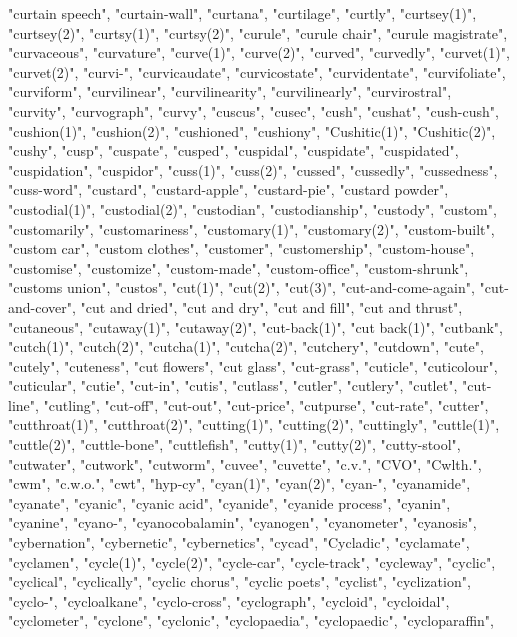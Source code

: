 "curtain speech",
"curtain-wall",
"curtana",
"curtilage",
"curtly",
"curtsey(1)",
"curtsey(2)",
"curtsy(1)",
"curtsy(2)",
"curule",
"curule chair",
"curule magistrate",
"curvaceous",
"curvature",
"curve(1)",
"curve(2)",
"curved",
"curvedly",
"curvet(1)",
"curvet(2)",
"curvi-",
"curvicaudate",
"curvicostate",
"curvidentate",
"curvifoliate",
"curviform",
"curvilinear",
"curvilinearity",
"curvilinearly",
"curvirostral",
"curvity",
"curvograph",
"curvy",
"cuscus",
"cusec",
"cush",
"cushat",
"cush-cush",
"cushion(1)",
"cushion(2)",
"cushioned",
"cushiony",
"Cushitic(1)",
"Cushitic(2)",
"cushy",
"cusp",
"cuspate",
"cusped",
"cuspidal",
"cuspidate",
"cuspidated",
"cuspidation",
"cuspidor",
"cuss(1)",
"cuss(2)",
"cussed",
"cussedly",
"cussedness",
"cuss-word",
"custard",
"custard-apple",
"custard-pie",
"custard powder",
"custodial(1)",
"custodial(2)",
"custodian",
"custodianship",
"custody",
"custom",
"customarily",
"customariness",
"customary(1)",
"customary(2)",
"custom-built",
"custom car",
"custom clothes",
"customer",
"customership",
"custom-house",
"customise",
"customize",
"custom-made",
"custom-office",
"custom-shrunk",
"customs union",
"custos",
"cut(1)",
"cut(2)",
"cut(3)",
"cut-and-come-again",
"cut-and-cover",
"cut and dried",
"cut and dry",
"cut and fill",
"cut and thrust",
"cutaneous",
"cutaway(1)",
"cutaway(2)",
"cut-back(1)",
"cut back(1)",
"cutbank",
"cutch(1)",
"cutch(2)",
"cutcha(1)",
"cutcha(2)",
"cutchery",
"cutdown",
"cute",
"cutely",
"cuteness",
"cut flowers",
"cut glass",
"cut-grass",
"cuticle",
"cuticolour",
"cuticular",
"cutie",
"cut-in",
"cutis",
"cutlass",
"cutler",
"cutlery",
"cutlet",
"cut-line",
"cutling",
"cut-off",
"cut-out",
"cut-price",
"cutpurse",
"cut-rate",
"cutter",
"cutthroat(1)",
"cutthroat(2)",
"cutting(1)",
"cutting(2)",
"cuttingly",
"cuttle(1)",
"cuttle(2)",
"cuttle-bone",
"cuttlefish",
"cutty(1)",
"cutty(2)",
"cutty-stool",
"cutwater",
"cutwork",
"cutworm",
"cuvee",
"cuvette",
"c.v.",
"CVO",
"Cwlth.",
"cwm",
"c.w.o.",
"cwt",
"hyp-cy",
"cyan(1)",
"cyan(2)",
"cyan-",
"cyanamide",
"cyanate",
"cyanic",
"cyanic acid",
"cyanide",
"cyanide process",
"cyanin",
"cyanine",
"cyano-",
"cyanocobalamin",
"cyanogen",
"cyanometer",
"cyanosis",
"cybernation",
"cybernetic",
"cybernetics",
"cycad",
"Cycladic",
"cyclamate",
"cyclamen",
"cycle(1)",
"cycle(2)",
"cycle-car",
"cycle-track",
"cycleway",
"cyclic",
"cyclical",
"cyclically",
"cyclic chorus",
"cyclic poets",
"cyclist",
"cyclization",
"cyclo-",
"cycloalkane",
"cyclo-cross",
"cyclograph",
"cycloid",
"cycloidal",
"cyclometer",
"cyclone",
"cyclonic",
"cyclopaedia",
"cyclopaedic",
"cycloparaffin",
